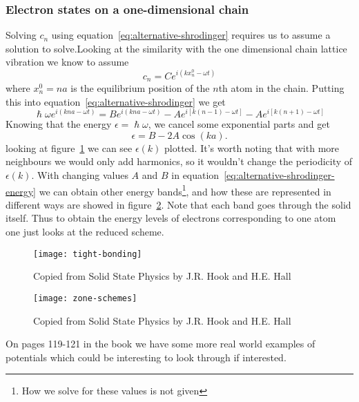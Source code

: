 \documentclass[11pt]{article}
\begin{document}
\subsubsection{Electron states on a one-dimensional chain}
Solving $c_n$ using equation~\ref{eq:alternative-shrodinger} requires us to assume a solution to solve.Looking at the similarity with the one dimensional chain lattice vibration we know to assume
\begin{equation}
	c_n = C e^{i(kx_n^0 - \omega t)}
\end{equation}
where $x_n^0 = na$ is the equilibrium position of the $n$th atom in the chain. Putting this into equation~\ref{eq:alternative-shrodinger} we get
\begin{equation}
	\hslash \omega e^{i(kna - \omega t)} = Be^{i(kna-\omega t)} - Ae^{i[k(n-1) - \omega t]} - Ae^{i[k(n+1) - \omega t]}
\end{equation}
Knowing that the energy $\epsilon = \hslash \omega$, we cancel some exponential parts and get
\begin{equation}
	\epsilon = B - 2A\cos{(ka)}.
	\label{eq:alternative-shrodinger-energy}
\end{equation}
looking at figure~\ref{fig:tight-bonding} we can see $\epsilon(k)$ plotted. It's worth noting that with more neighbours we would only add harmonics, so it wouldn't change the periodicity of $\epsilon(k)$. With changing values $A$ and $B$ in equation~\ref{eq:alternative-shrodinger-energy} we can obtain other energy bands\footnote{How we solve for these values is not given}, and how these are represented in different ways are showed in figure~\ref{fig:zone-schemes}. Note that each band goes through the solid itself. Thus to obtain the energy levels of electrons corresponding to one atom one just looks at the reduced scheme.
\begin{figure}[!ht] 
	\centering
	\texttt{[image: tight-bonding]}
	\caption{Copied from Solid State Physics by J.R. Hook and H.E. Hall}
	\label{fig:tight-bonding}
\end{figure}
\begin{figure}[!ht]
	\centering
	\texttt{[image: zone-schemes]}
	\caption{Copied from Solid State Physics by J.R. Hook and H.E. Hall}
	\label{fig:zone-schemes}
\end{figure}
On pages 119-121 in the book we have some more real world examples of potentials which could be interesting to look through if interested.

\newpage
\end{document}
